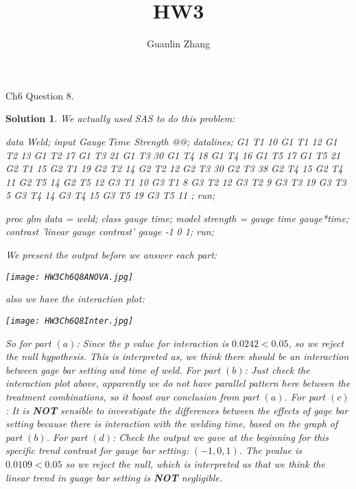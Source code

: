 \documentclass[11pt]{article}
\title{HW3}
\author{Guanlin Zhang}
\newtheorem{sol}{Solution}
\begin{document}
Ch6 Question $8$.
\begin{sol}
	We actually used SAS to do this problem:
	\begin{Datastep}
	data Weld;
	input Gauge $ Time $ Strength @@;
	datalines;
	 G1 T1 10 G1 T1 12 G1 T2 13 G1 T2 17 G1 T3 21 G1 T3 30 
	 G1 T4 18 G1 T4 16 G1 T5 17 G1 T5 21 G2 T1 15 G2 T1 19 
	 G2 T2 14 G2 T2 12 G2 T3 30 G2 T3 38 G2 T4 15 G2 T4 11 
	 G2 T5 14 G2 T5 12 G3 T1 10 G3 T1 8  G3 T2 12 G3 T2 9  
	 G3 T3 19 G3 T3 5  G3 T4 14 G3 T4 15 G3 T5 19 G3 T5 11 
	;
run;

proc glm data = weld;
	class gauge time;
	model strength = gauge time gauge*time;
	contrast 'linear gauge contrast' gauge -1 0 1;
run;
	\end{Datastep}
	We present the output before we answer each part:
	\begin{center}
		\texttt{[image: HW3Ch6Q8ANOVA.jpg]}
	\end{center}
	also we have the interaction plot:
	\begin{center}
		\texttt{[image: HW3Ch6Q8Inter.jpg]}
	\end{center}
	So for part $(a)$:\vskip 2mm
	Since the p value for interaction is $0.0242 < 0.05$, so we reject the null hypothesis. This is interpreted as, we think there should be an interaction between gage bar setting and time of weld.\vskip 2mm
	For part $(b)$: \vskip 2mm
	Just check the interaction plot above, apparently we do not have parallel pattern here between the treatment combinations, so it boost our conclusion from part $(a)$.\vskip 2mm
	For part $(c)$: \vskip 2mm
	It is {\bf NOT} sensible to inveestigate the differences between the effects of gage bar setting because there is interaction with the welding time, based on the graph of part $(b)$.\vskip 2mm
	For part $(d)$: \vskip 2mm
	Check the output we gave at the beginning for this specific trend contrast for gauge bar setting: $(-1, 0, 1)$. The pvalue is $0.0109 < 0.05$ so we reject the null, which is interpreted as that we think the linear trend in guage bar setting is {\bf NOT} negligible. 
\end{sol}
\end{document}
